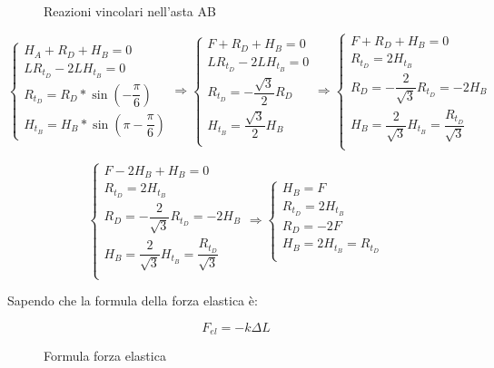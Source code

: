 \documentclass[main.tex]{subfiles}
\begin{document}
\begin{figure}[H]
\centering
\resizebox{.5\textwidth}{!}{}
\caption{Reazioni vincolari nell'asta AB}
\end{figure}

\[
\begin{cases}
	H_A + R_D + H_B = 0\\
	LR_{t_D}	- 2LH_{t_B} = 0\\
	R_{t_D} = R_D*\sin\left(-\dfrac{\pi}{6} \right)\\
	H_{t_B}= H_B*\sin\left(\pi - \dfrac{\pi}{6} \right)
\end{cases}
\Longrightarrow
\begin{cases}
	F + R_D + H_B = 0\\
	LR_{t_D}	- 2LH_{t_B} = 0\\
	R_{t_D} = -\dfrac{\sqrt{3}}{2}R_D\\
	H_{t_B}= \dfrac{\sqrt{3}}{2}H_B\\
\end{cases}
\Longrightarrow
\begin{cases}
	F + R_D + H_B = 0\\
	R_{t_D} = 2H_{t_B}\\
	R_D = -\dfrac{2}{\sqrt{3}}R_{t_D} = -2H_B \\
	H_B = \dfrac{2}{\sqrt{3}}H_{t_B} = \dfrac{R_{t_D}}{\sqrt{3}}\\
\end{cases}
\]

\[
\begin{cases}
	F -2H_B + H_B = 0\\
	R_{t_D} = 2H_{t_B}\\
	R_D = -\dfrac{2}{\sqrt{3}}R_{t_D} = -2H_B \\
	H_B = \dfrac{2}{\sqrt{3}}H_{t_B} = \dfrac{R_{t_D}}{\sqrt{3}}\\
\end{cases}
\Longrightarrow
\begin{cases}
	H_B = F \\
	R_{t_D} = 2H_{t_B}\\
	R_D = -2F\\
	H_B = 2H_{t_B} = R_{t_D}\\
\end{cases}
\]

Sapendo che la formula della forza elastica è:

\begin{figure}[H]
	\[
		F_{el} = -k\Delta L
	\]
	\caption{Formula forza elastica}
\end{figure}
\end{document}
